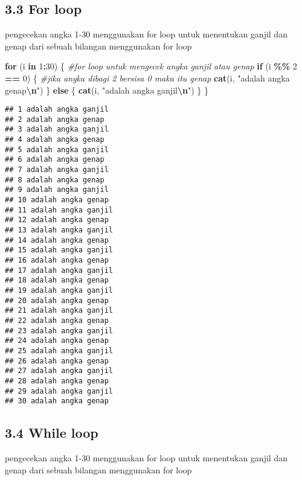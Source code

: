 \documentclass[
]{article}
\newenvironment{Shaded}{\begin{snugshade}}{\end{snugshade}}
\newcommand{\CommentTok}[1]{\textcolor[rgb]{0.56,0.35,0.01}{\textit{#1}}}
\newcommand{\ControlFlowTok}[1]{\textcolor[rgb]{0.13,0.29,0.53}{\textbf{#1}}}
\newcommand{\DecValTok}[1]{\textcolor[rgb]{0.00,0.00,0.81}{#1}}
\newcommand{\FunctionTok}[1]{\textcolor[rgb]{0.13,0.29,0.53}{\textbf{#1}}}
\newcommand{\NormalTok}[1]{#1}
\newcommand{\SpecialCharTok}[1]{\textcolor[rgb]{0.81,0.36,0.00}{\textbf{#1}}}
\newcommand{\StringTok}[1]{\textcolor[rgb]{0.31,0.60,0.02}{#1}}
\begin{document}
\subsection{3.3 For loop}\label{for-loop}

pengecekan angka 1-30 menggunakan for loop untuk menentukan ganjil dan
genap dari sebuah bilangan menggunakan for loop

\begin{Shaded}
\begin{Highlighting}[]
\ControlFlowTok{for}\NormalTok{ (i }\ControlFlowTok{in} \DecValTok{1}\SpecialCharTok{:}\DecValTok{30}\NormalTok{) \{          }\CommentTok{\#for loop untuk mengecek angka ganjil atau genap}
  \ControlFlowTok{if}\NormalTok{ (i }\SpecialCharTok{\%\%} \DecValTok{2} \SpecialCharTok{==} \DecValTok{0}\NormalTok{) \{       }\CommentTok{\#jika angka dibagi 2 bersisa 0 maka itu genap}
    \FunctionTok{cat}\NormalTok{(i, }\StringTok{"adalah angka genap}\SpecialCharTok{\textbackslash{}n}\StringTok{"}\NormalTok{)}
\NormalTok{  \} }\ControlFlowTok{else}\NormalTok{ \{}
    \FunctionTok{cat}\NormalTok{(i, }\StringTok{"adalah angka ganjil}\SpecialCharTok{\textbackslash{}n}\StringTok{"}\NormalTok{)}
\NormalTok{  \}}
\NormalTok{\}}
\end{Highlighting}
\end{Shaded}

\begin{verbatim}
## 1 adalah angka ganjil
## 2 adalah angka genap
## 3 adalah angka ganjil
## 4 adalah angka genap
## 5 adalah angka ganjil
## 6 adalah angka genap
## 7 adalah angka ganjil
## 8 adalah angka genap
## 9 adalah angka ganjil
## 10 adalah angka genap
## 11 adalah angka ganjil
## 12 adalah angka genap
## 13 adalah angka ganjil
## 14 adalah angka genap
## 15 adalah angka ganjil
## 16 adalah angka genap
## 17 adalah angka ganjil
## 18 adalah angka genap
## 19 adalah angka ganjil
## 20 adalah angka genap
## 21 adalah angka ganjil
## 22 adalah angka genap
## 23 adalah angka ganjil
## 24 adalah angka genap
## 25 adalah angka ganjil
## 26 adalah angka genap
## 27 adalah angka ganjil
## 28 adalah angka genap
## 29 adalah angka ganjil
## 30 adalah angka genap
\end{verbatim}

\subsection{3.4 While loop}\label{while-loop}

pengecekan angka 1-30 menggunakan for loop untuk menentukan ganjil dan
genap dari sebuah bilangan menggunakan for loop
\end{document}
